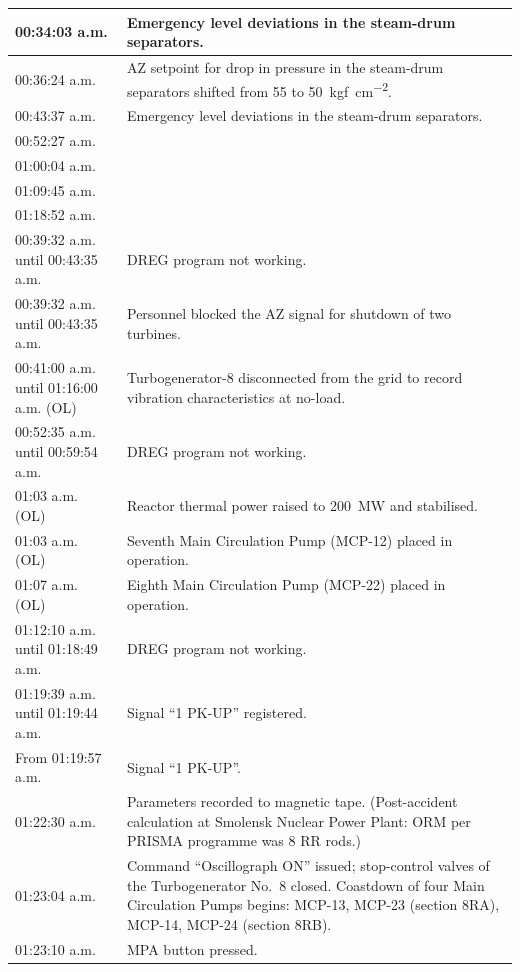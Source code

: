 \documentclass[openright]{bookest}
\begin{document}
\begin{center}
\begin{longtable}{|p{6em}|p{27em}|}
    00:34:03 a.m. & Emergency level deviations in the steam-drum separators. \\ \hline
    00:36:24 a.m. & AZ setpoint for drop in pressure in the steam-drum separators shifted from \num{55} to \qty{50}{kgf\per\centi\metre\squared}.\\ \hline
    00:43:37 a.m. & Emergency level deviations in the steam-drum separators. \\ \hline
    00:52:27 a.m. & \\ \hline
    01:00:04 a.m. & \\ \hline
    01:09:45 a.m. & \\ \hline
    01:18:52 a.m. & \\ \hline
    00:39:32 a.m. until 00:43:35 a.m. & DREG program not working. \\ \hline
    00:39:32 a.m. until 00:43:35 a.m. & Personnel blocked the AZ signal for shutdown of two turbines. \\ \hline
    00:41:00 a.m. until 01:16:00 a.m. (OL) & Turbogenerator-8 disconnected from the grid to record vibration characteristics at no-load.\\ \hline
    00:52:35 a.m. until 00:59:54 a.m. & DREG program not working. \\ \hline
    01:03 a.m. (OL) & Reactor thermal power raised to \qty{200}{\mega\watt} and stabilised. \\ \hline
    01:03 a.m. (OL) & Seventh Main Circulation Pump (MCP-12) placed in operation. \\ \hline
    01:07 a.m. (OL) & Eighth Main Circulation Pump (MCP-22) placed in operation. \\ \hline
    01:12:10 a.m. until 01:18:49 a.m. & DREG program not working. \\ \hline
    01:19:39 a.m. until 01:19:44 a.m. & Signal ``1 PK-UP'' registered. \\ \hline
    From 01:19:57 a.m. & Signal ``1 PK-UP''. \\ \hline
    01:22:30 a.m. & Parameters recorded to magnetic tape. (Post-accident calculation at Smolensk Nuclear Power Plant: ORM per PRISMA programme was 8 RR rods.)\\ \hline
    01:23:04 a.m. & Command ``Oscillograph ON'' issued; stop-control valves of the Turbogenerator No.~8 closed. Coastdown of four Main Circulation Pumps begins: MCP-13, MCP-23 (section 8RA), MCP-14, MCP-24 (section 8RB). \\ \hline
    01:23:10 a.m. & MPA button pressed. \\ \hline

\end{longtable}
\end{center}
\end{document}
